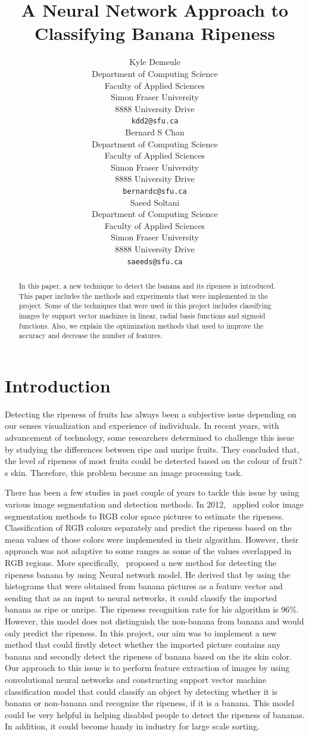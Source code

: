 \documentclass{article} %
\title{A Neural Network Approach to Classifying Banana Ripeness}
\author{
Kyle Demeule\\
Department of Computing Science\\
Faculty of Applied Sciences\\
Simon Fraser University\\
8888 University Drive\\
\texttt{kdd2@sfu.ca} \\
\And
Bernard S Chan \\
Department of Computing Science\\
Faculty of Applied Sciences\\
Simon Fraser University\\
8888 University Drive\\
\texttt{bernardc@sfu.ca} \\
\AND
Saeed Soltani\\
Department of Computing Science\\Faculty of Applied Sciences\\
Simon Fraser University\\
8888 University Drive\\
\texttt{saeeds@sfu.ca} \\
}
\begin{document}
\maketitle

\begin{abstract}
In this paper, a new technique to detect the banana and its ripeness is introduced. This paper includes the methods and experiments that were implemented in the project. Some of the techniques that were used in this project includes classifying images by support vector machines in linear, radial basis functions and sigmoid functions. Also, we explain the optimization methods that used to improve the accuracy and decrease the number of features.\end{abstract}

\section{Introduction}

Detecting the ripeness of fruits has always been a subjective issue depending on our senses visualization and experience of individuals. In recent years, with advancement of technology, some researchers determined to challenge this issue by studying the differences between ripe and unripe fruits. They concluded that, the level of ripeness of most fruits could be detected based on the colour of fruit?s skin. Therefore, this problem became an image processing task. 

There has been a few studies in past couple of years to tackle this issue by using various image segmentation and detection methods. In 2012,~\citet{dadwal2012color} applied color image segmentation methods to RGB color space pictures to estimate the ripeness. Classification of RGB colours separately and predict the ripeness based on the mean values of those colors were implemented in their algorithm. However, their approach was not adaptive to some ranges as some of the values overlapped in RGB regions. More specifically,~\citet{paulraj2009color} proposed a new method for detecting the ripeness banana by using Neural network model. He derived that by using the histograms that were obtained from banana pictures as a feature vector and sending that as an input to neural networks, it could classify the imported banana as ripe or unripe. The ripeness recognition rate for his algorithm is 96\%. However, this model does not distinguish the non-banana from banana and would only predict the ripeness. In this project, our aim was to implement a new method that could firstly detect whether the imported picture contains any banana and secondly detect the ripeness of banana based on the its skin color. Our approach to this issue is to perform feature extraction of images by using convolutional neural networks and constructing support vector machine classification model that could classify an object by detecting whether it is banana or non-banana and recognize the ripeness, if it is a banana. This model could be very helpful in helping disabled people to detect the ripeness of bananas. In addition, it could become handy in industry for large scale sorting. 
\end{document}
